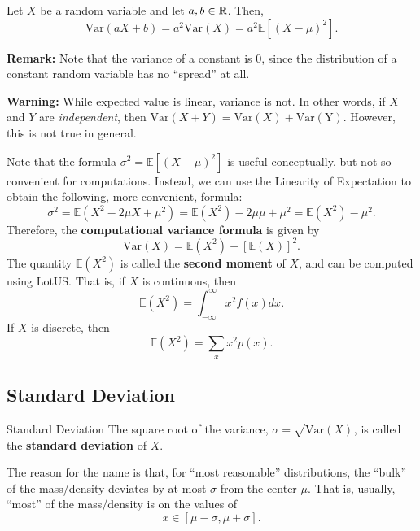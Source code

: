 \documentclass[letterpaper]{article}
\begin{document}
\begin{theorem}{}{}
    Let $X$ be a random variable and let $a, b \in \mathbb{R}$. Then, 
    \[\text{Var}(aX + b) = a^2\text{Var}(X) = a^2 \mathbb{E}[(X - \mu)^2].\]
\end{theorem}
\textbf{Remark:} Note that the variance of a constant is 0, since the distribution of a constant random variable has no ``spread'' at all. 

\textbf{Warning:} While expected value is linear, variance is not. In other words, if $X$ and $Y$ are \emph{independent}, then $\text{Var}(X + Y) = \text{Var}(X) + \text{Var}(\text{Y})$. However, this is not true in general. 

\bigskip 

Note that the formula $\sigma^2 = \mathbb{E}[(X - \mu)^2]$ is useful conceptually, but not so convenient for computations. Instead, we can use the Linearity of Expectation to obtain the following, more convenient, formula: 
\[\sigma^2 = \mathbb{E}(X^2 - 2\mu X + \mu^2) = \mathbb{E}(X^2) - 2\mu \mu + \mu^2 = \mathbb{E}(X^2) - \mu^2.\]
Therefore, the \textbf{computational variance formula} is given by 
\[\boxed{\text{Var}(X) = \mathbb{E}(X^2) - [\mathbb{E}(X)]^2}.\]
The quantity $\mathbb{E}(X^2)$ is called the \textbf{second moment} of $X$, and can be computed using LotUS. That is, if $X$ is continuous, then 
\[\mathbb{E}(X^2) = \int_{-\infty}^{\infty} x^2 f(x) dx.\]
If $X$ is discrete, then 
\[\mathbb{E}(X^2) = \sum_{x} x^2 p(x).\]

\subsection{Standard Deviation}
\begin{definition}{Standard Deviation}{}
    The square root of the variance, $\sigma = \sqrt{\text{Var}(X)}$, is called the \textbf{standard deviation} of $X$.
\end{definition}
The reason for the name is that, for ``most reasonable'' distributions, the ``bulk'' of the mass/density deviates by at most $\sigma$ from the center $\mu$. That is, usually, ``most'' of the mass/density is on the values of 
\[x \in [\mu - \sigma, \mu + \sigma].\]
\end{document}
